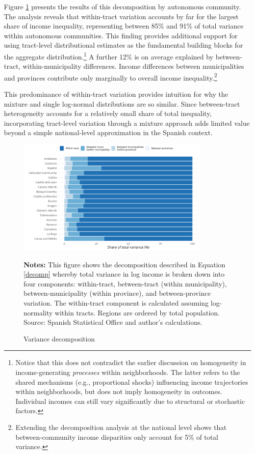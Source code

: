 Figure \ref{fig:variance_decomp} presents the results of this decomposition by autonomous community. The analysis reveals that within-tract variation accounts by far for the largest share of income inequality, representing between 85\% and 91\% of total variance within autonomous communities. This finding provides additional support for using tract-level distributional estimates as the fundamental building blocks for the aggregate distribution.\footnote{Notice that this does not contradict the earlier discussion on homogeneity in income-generating \textit{processes} within neighborhoods. The latter refers to the shared mechanisms (e.g., proportional shocks) influencing income trajectories within neighborhoods, but does not imply homogeneity in outcomes. Individual incomes can still vary significantly due to structural or stochastic factors.} A further 12\% is on average explained by between-tract, within-municipality differences. Income differences between municipalities and provinces contribute only marginally to overall income inequality.\footnote{Extending the decomposition analysis at the national level shows that between-community income disparities only account for 5\% of total variance.}

This predominance of within-tract variation provides intuition for why the mixture and single log-normal distributions are so similar. Since between-tract heterogeneity accounts for a relatively small share of total inequality, incorporating tract-level variation through a mixture approach adds limited value beyond a simple national-level approximation in the Spanish context.

\begin{figure}[H]
\begin{center}
\captionsetup{justification=centering}
\caption{Variance decomposition}
\label{fig:variance_decomp}
\includegraphics[width=0.85\textwidth]{output/variance_decomp.png}
\end{center}
\begin{fignotes2}
\textbf{Notes:} This figure shows the decomposition described in Equation \ref{decomp} whereby total variance in log income is broken down into four components: within-tract, between-tract (within municipality), between-municipality (within province), and between-province variation. The within-tract component is calculated assuming log-normality within tracts. Regions are ordered by total population. Source: Spanish Statistical Office and author's calculations.
\end{fignotes2}
\end{figure}